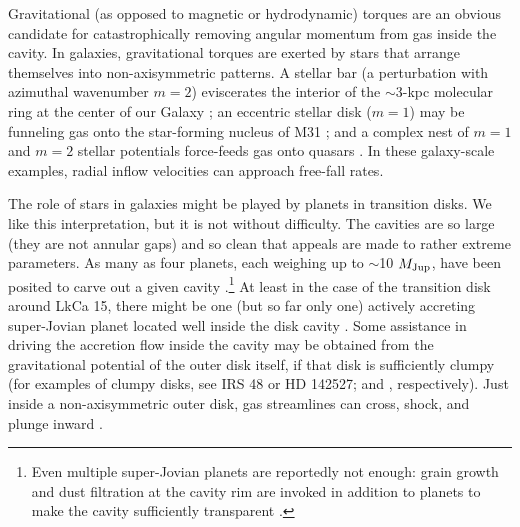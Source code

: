 Gravitational (as opposed to magnetic or hydrodynamic) torques are an obvious 
candidate for catastrophically removing angular momentum from gas inside the 
cavity.  In galaxies, gravitational torques are exerted by stars that arrange 
themselves into non-axisymmetric patterns.  A stellar bar (a perturbation with
azimuthal wavenumber $m=2$) eviscerates the interior of the $\sim$3-kpc 
molecular ring at the center of our Galaxy \citep{Schwarz81,Binney91}; an 
eccentric stellar disk ($m=1$) may be funneling gas onto the star-forming 
nucleus of M31 \citep{Chang07}; and a complex nest of $m=1$ and $m=2$ stellar 
potentials force-feeds gas onto quasars \citep{Shlosman89,Hopkins11}.  In these 
galaxy-scale examples, radial inflow velocities can approach free-fall rates.

The role of stars in galaxies might be played by planets in transition disks.  
We like this interpretation, but it is not without difficulty.  The cavities 
are so large (they are not annular gaps) and so clean that appeals are made to 
rather extreme parameters.  As many as four planets, each weighing up to 
$\sim$10 $M_{\rm Jup}$, have been posited to carve out a given cavity 
\citep{Zhu11,dodson11}.\footnote{Even multiple super-Jovian planets are 
reportedly not enough: grain growth and dust filtration at the cavity rim are 
invoked in addition to planets to make the cavity sufficiently transparent 
\citep{Zhu11,dong12}.}  At least in the case of the transition disk around LkCa 
15, there might be one (but so far only one) actively accreting super-Jovian 
planet located well inside the disk cavity \citep{Kraus12}.  Some assistance in 
driving the accretion flow inside the cavity may be obtained from the 
gravitational potential of the outer disk itself, if that disk is sufficiently 
clumpy (for examples of clumpy disks, see IRS 48 or HD 142527; 
\citealt{vandermarel13} and \citealt{casassus13}, respectively).  Just inside a 
non-axisymmetric outer disk, gas streamlines can cross, shock, and plunge 
inward \citep[e.g.,][]{paczynski77}.

